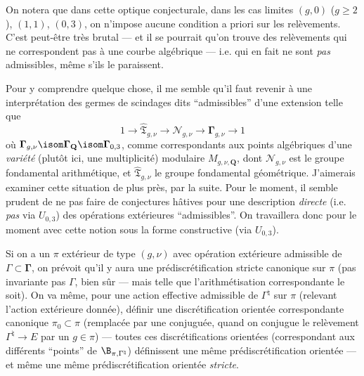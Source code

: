 On notera que dans cette optique conjecturale, dans les cas limites $(g,0)$ ($g\ge 2$), $(1,1)$, $(0,3)$, on n'impose aucune condition a priori sur les relèvements. C'est peut-être très brutal --- et il se pourrait qu'on trouve des relèvements qui ne correspondent pas à une courbe algébrique --- i.e. qui en fait ne sont \emph{pas} admissibles, même s'ils le paraissent.

Pour y comprendre quelque chose, il me semble qu'il faut revenir à une interprétation des germes de scindages dits ``admissibles'' d'une extension telle que
$$
1\to\hat{\mathfrak{T}}_{g,\nu}\to\mathcal{N}_{g,\nu}\to
\boldsymbol{\Gamma}_{g,\nu}\to 1
$$
où $\boldsymbol{\Gamma}_{g,\nu} \isom \boldsymbol{\Gamma}_{\mathbf{Q}} \isom \boldsymbol{\Gamma}_{0,3}$, comme correspondants aux points algébriques d'une \emph{variété} (plutôt ici, une multiplicité) modulaire $M_{g,\nu,{\mathbf{Q}}}$, dont $\mathcal{N}_{g,\nu}$ est le groupe fondamental arithmétique, et $\hat{\mathfrak{T}}_{g,\nu}$ le groupe fondamental géométrique. J'aimerais examiner cette situation de plus près, par la suite. Pour le moment, il semble prudent de ne pas faire de conjectures hâtives pour une description \emph{directe} (i.e. \emph{pas} via $U_{0,3}$) des opérations extérieures ``admissibles''. On travaillera donc pour le moment avec cette notion sous la forme constructive (via $U_{0,3}$).

Si on a un $\pi$ extérieur de type $(g,\nu)$ avec opération extérieure admissible de $\Gamma\subset \boldsymbol{\Gamma}$, on prévoit qu'il y aura une prédiscrétification stricte canonique sur $\pi$ (pas invariante pas $\Gamma$, bien sûr --- mais telle que l'arithmétisation correspondante le soit). On va même, pour une action effective admissible de $\Gamma^\natural$ sur $\pi$ (relevant l'action extérieure donnée), définir une discrétification orientée correspondante canonique $\pi_0 \subset \pi$ (remplacée par une conjuguée, quand on conjugue le relèvement $\Gamma^\natural\to E$ par un $g\in\pi$) --- toutes ces discrétifications orientées (correspondant aux différents ``points'' de $\B_{\pi,\Gamma^\natural}$) définissent une même prédiscrétification orientée --- et même une même prédiscrétification orientée \emph{stricte}.

